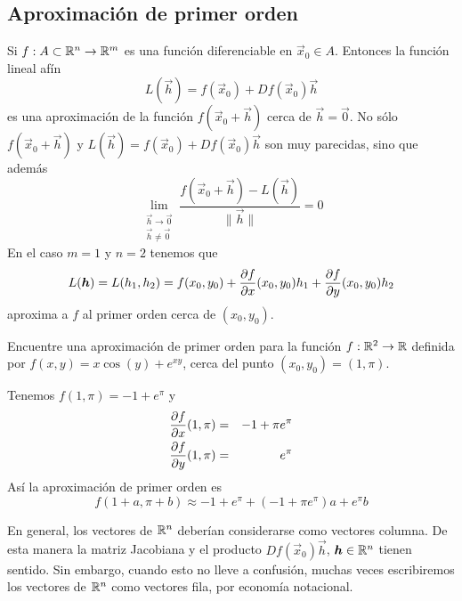 \subsection{Aproximaci\'on de primer orden}
Si $f:A\subset \mathbb{R}^n\to\mathbb{R}^m$ es una funci\'on diferenciable en $\vec{x}_0\in A$.
Entonces la funci\'on lineal af\'in
$$
L(\vec{h})=f(\vec{x}_0)+Df(\vec{x}_0)\vec{h}
$$
es una aproximaci\'on de la funci\'on $f(\vec{x}_0+\vec{h})$ cerca de $\vec{h}=\vec{0}$. No s\'olo
$f(\vec{x}_0+\vec{h})$ y $L(\vec{h})=f(\vec{x}_0)+Df(\vec{x}_0)\vec{h}$ son muy parecidas, sino que adem\'as
\begin{equation}\label{condicion-diferenciabilidad-2}
\lim_{\substack{\vec{h} \to \vec{0}\\ \vec{h}\neq \vec{0}}}\frac{f(\vec{x}_0+\vec{h})-L(\vec{h})}{\|\vec{h}\|} = 0
\end{equation}
En el caso $m=1$ y $n=2$ tenemos
que
$$
L(\boldsymbol{h})=L(h_1,h_2)=f(x_0,y_0)+\frac{\partial f}{\partial x}(x_0,y_0)h_1+
\frac{\partial f}{\partial y}(x_0,y_0)h_2
$$
aproxima a $f$ al primer orden cerca de $(x_0,y_0)$.              
\begin{ejemplo} 
Encuentre una aproximaci\'on de primer orden para la funci\'on
$f:\mathbb{R}^2\to\mathbb{R}$ definida por $f(x,y)=x\cos(y)+ e^{xy}$, cerca del punto $(x_0,y_0)=(1,\pi)$.

\begin{solucion}
Tenemos $f(1,\pi)=-1+e^\pi$ y
\begin{eqnarray*}
\frac{\partial f}{\partial x}(1,\pi) &=& -1 +\pi e^\pi \\ 
\frac{\partial f}{\partial y}(1,\pi) &=&  e^\pi
\end{eqnarray*}
As\'i la aproximaci\'on de primer orden es
$$
f(1+a,\pi+b)\approx  -1 +e^\pi +(-1 +\pi e^\pi)a+ e^\pi b
$$
\end{solucion}
\end{ejemplo}

\begin{nota}
En general, los vectores de $\mathbb{R}^n$ deber\'ian considerarse como vectores
columna. De esta manera la matriz Jacobiana y el producto $Df(\vec{x}_0)\vec{h}$, $\boldsymbol{h}\in \mathbb{R}^n$
tienen sentido. Sin embargo, cuando esto no lleve a confusi\'on, muchas veces
escribiremos los vectores de $\mathbb{R}^n$ como vectores fila, por econom\'ia notacional.
\end{nota}

